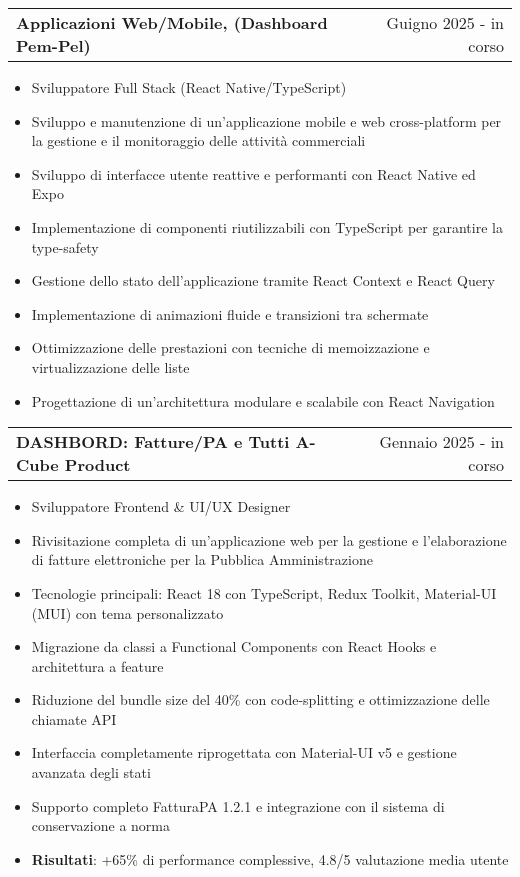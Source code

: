 \documentclass[a4paper,12pt]{article}
\makeatletter
\newenvironment{joblong}[2]
    {
    \begin{tabularx}{\linewidth}{@{}l X r@{}}
    \textbf{#1} & \hfill &  #2 \\[3.75pt]
    \end{tabularx}
    \begin{minipage}[t]{\linewidth}
    \begin{itemize}[nosep,after=\strut, leftmargin=1em, itemsep=3pt,label=--]
    }
    {
    \end{itemize}
    \end{minipage}    
    }
\makeatother
\begin{document}
\begin{joblong}{Applicazioni Web/Mobile, (Dashboard Pem-Pel)}{Guigno 2025 - in corso}
\item Sviluppatore Full Stack (React Native/TypeScript)
\item Sviluppo e manutenzione di un'applicazione mobile e web cross-platform per la gestione e il monitoraggio delle attività commerciali
\item Sviluppo di interfacce utente reattive e performanti con React Native ed Expo
\item Implementazione di componenti riutilizzabili con TypeScript per garantire la type-safety
\item Gestione dello stato dell'applicazione tramite React Context e React Query
\item Implementazione di animazioni fluide e transizioni tra schermate
\item Ottimizzazione delle prestazioni con tecniche di memoizzazione e virtualizzazione delle liste
\item Progettazione di un'architettura modulare e scalabile con React Navigation
\end{joblong}

\begin{joblong}{DASHBORD: Fatture/PA e Tutti A-Cube Product}{Gennaio 2025 - in corso}
\item Sviluppatore Frontend \& UI/UX Designer
\item Rivisitazione completa di un'applicazione web per la gestione e l'elaborazione di fatture elettroniche per la Pubblica Amministrazione
\item Tecnologie principali: React 18 con TypeScript, Redux Toolkit, Material-UI (MUI) con tema personalizzato
\item Migrazione da classi a Functional Components con React Hooks e architettura a feature
\item Riduzione del bundle size del 40\% con code-splitting e ottimizzazione delle chiamate API
\item Interfaccia completamente riprogettata con Material-UI v5 e gestione avanzata degli stati
\item Supporto completo FatturaPA 1.2.1 e integrazione con il sistema di conservazione a norma
\item \textbf{Risultati}: +65\% di performance complessive, 4.8/5 valutazione media utente
\end{joblong}
\end{document}
